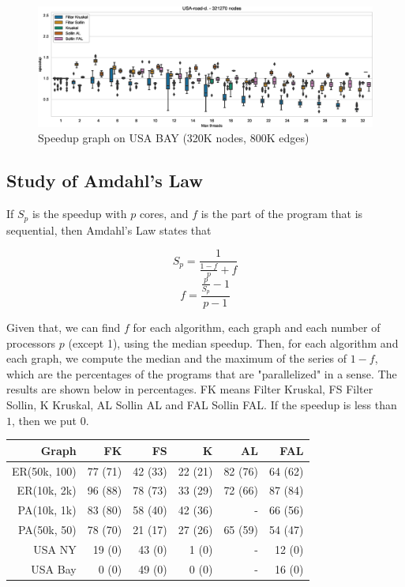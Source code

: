 \documentclass[letterpaper]{article}
\begin{document}
\begin{figure}\centering
  \includegraphics[width=\linewidth]{graphics/Box_Speedup_USA-road-d._321270.eps}
  \caption{Speedup graph on USA BAY (320K nodes, 800K edges)\label{usaBAYspeedup}}
\end{figure}


\subsection{Study of Amdahl's Law}

If $S_p$ is the speedup with $p$ cores, and $f$ is the part of the program that is sequential, then Amdahl's Law states that

\[
        S_p = \frac{1}{\frac{1-f}{p} + f}
\]
\[
        f = \frac{\frac{p}{S_p} - 1}{p - 1}
\]

Given that, we can find $f$ for each algorithm, each graph and each number of processors $p$ (except 1), using the median speedup.
Then, for each algorithm and each graph, we compute the median and the maximum of the series of $1-f$, which are the percentages of the programs that are "parallelized" in a sense.
The results are shown below in percentages.
FK means Filter Kruskal, FS Filter Sollin, K Kruskal, AL Sollin AL and FAL Sollin FAL.
If the speedup is less than $1$, then we put $0$.

\begin{tabular}{rrrrrr}
\hline
                                                   Graph &   FK &   FS &   K &   AL &   FAL \\
\hline
ER(50k, 100) &          77 (71) &         42 (33) &   22 (21) &     82 (76) &      64 (62) \\
ER(10k, 2k) &          96 (88) &         78 (73) &   33 (29) &     72 (66) &      87 (84) \\
PA(10k, 1k) &          83 (80) &         58 (40) &   42 (36) &           - &      66 (56) \\
PA(50k, 50) &          78 (70) &         21 (17) &   27 (26) &     65 (59) &      54 (47) \\
USA NY &           19 (0) &          43 (0) &     1 (0) &           - &       12 (0) \\
USA Bay &            0 (0) &          49 (0) &     0 (0) &           - &       16 (0) \\
\hline
\end{tabular}
\end{document}
